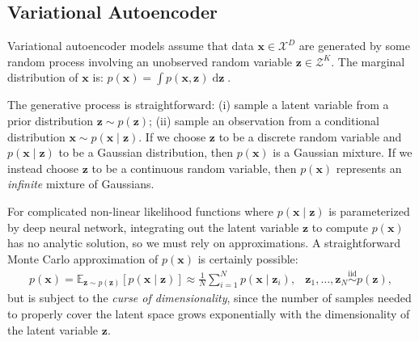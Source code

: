 \subsection{Variational Autoencoder}
%
Variational autoencoder models assume that data $\mathbf{x} \in \mathcal{X}^D$ are generated by some random process involving an unobserved random variable $\mathbf{z} \in \mathcal{Z}^K$. The marginal distribution of $\mathbf{x}$ is: $p(\mathbf{x}) = \int p(\mathbf{x}, \mathbf{z})\mathop{\mathrm{d}\mathbf{z}}$. 

The generative process is straightforward: (i) sample a latent variable from a prior distribution $\mathbf{z} \sim p(\mathbf{z})$; (ii) sample an observation from a conditional distribution $\mathbf{x}\sim p(\mathbf{x} \mid \mathbf{z})$. If we choose $\mathbf{z}$ to be a discrete random variable and $p(\mathbf{x} \mid \mathbf{z})$ to be a Gaussian distribution, then $p(\mathbf{x})$ is a Gaussian mixture. If we instead choose $\mathbf{z}$ to be a continuous random variable, then $p(\mathbf{x})$ represents an \textit{infinite} mixture of Gaussians.

For complicated non-linear likelihood functions where $p(\mathbf{x} \mid \mathbf{z})$ is parameterized by deep neural network, integrating out the latent variable $\mathbf{z}$ to compute $p(\mathbf{x})$ has no analytic solution, so we must rely on approximations. A straightforward Monte Carlo approximation of $p(\mathbf{x})$ is certainly possible: 
%
\begin{align}
&p(\mathbf{x}) = \mathbb{E}_{\mathbf{z} \sim p(\mathbf{z})} \left[p(\mathbf{x} \mid \mathbf{z})\right] \approx
\frac{1}{N}\sum_{i=1}^N p(\mathbf{x} \mid \mathbf{z}_i), &\mathbf{z}_1,\dots,\mathbf{z}_N \mathop{\sim}\limits^{\mathrm{iid}} p(\mathbf{z}), &
\end{align}
%
but is subject to the \textit{curse of dimensionality}, since the number of samples needed to properly cover the latent space grows exponentially with the dimensionality of the latent variable $\mathbf{z}$.

